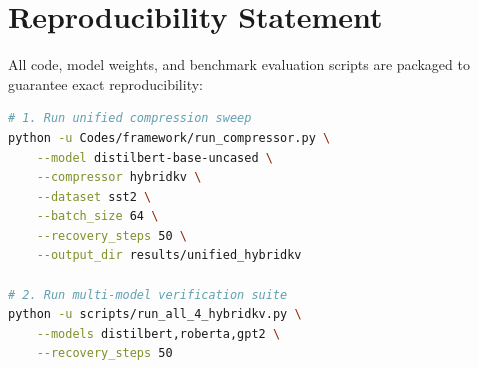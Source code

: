 \section{Reproducibility Statement}
All code, model weights, and benchmark evaluation scripts are packaged to guarantee exact reproducibility:
\begin{lstlisting}[language=bash]
# 1. Run unified compression sweep
python -u Codes/framework/run_compressor.py \
    --model distilbert-base-uncased \
    --compressor hybridkv \
    --dataset sst2 \
    --batch_size 64 \
    --recovery_steps 50 \
    --output_dir results/unified_hybridkv

# 2. Run multi-model verification suite
python -u scripts/run_all_4_hybridkv.py \
    --models distilbert,roberta,gpt2 \
    --recovery_steps 50
\end{lstlisting}
